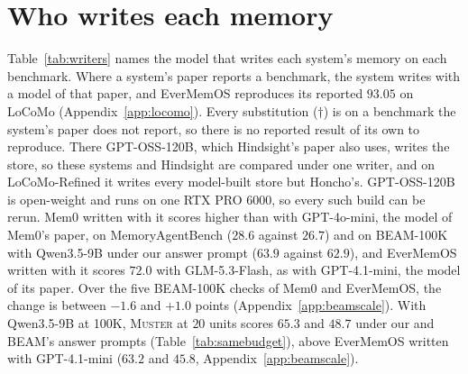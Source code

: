 \documentclass{article}
\newcommand{\sys}{\textsc{Muster}}
\begin{document}
\section{Who writes each memory}\label{app:writers}

Table~\ref{tab:writers} names the model that writes each system's memory on each benchmark. Where a system's paper reports a benchmark, the system writes with a model of that paper, and EverMemOS reproduces its reported $93.05$ on LoCoMo (Appendix~\ref{app:locomo}). Every substitution ($\dagger$) is on a benchmark the system's paper does not report, so there is no reported result of its own to reproduce. There GPT-OSS-120B, which Hindsight's paper also uses, writes the store, so these systems and Hindsight are compared under one writer, and on LoCoMo-Refined it writes every model-built store but Honcho's. GPT-OSS-120B is open-weight and runs on one RTX PRO 6000, so every such build can be rerun. Mem0 written with it scores higher than with GPT-4o-mini, the model of Mem0's paper, on MemoryAgentBench ($28.6$ against $26.7$) and on BEAM-100K with Qwen3.5-9B under our answer prompt ($63.9$ against $62.9$), and EverMemOS written with it scores $72.0$ with GLM-5.3-Flash, as with GPT-4.1-mini, the model of its paper. Over the five BEAM-100K checks of Mem0 and EverMemOS, the change is between $-1.6$ and $+1.0$ points (Appendix~\ref{app:beamscale}). With Qwen3.5-9B at 100K, \sys{} at $20$ units scores $65.3$ and $48.7$ under our and BEAM's answer prompts (Table~\ref{tab:samebudget}), above EverMemOS written with GPT-4.1-mini ($63.2$ and $45.8$, Appendix~\ref{app:beamscale}).
\end{document}
